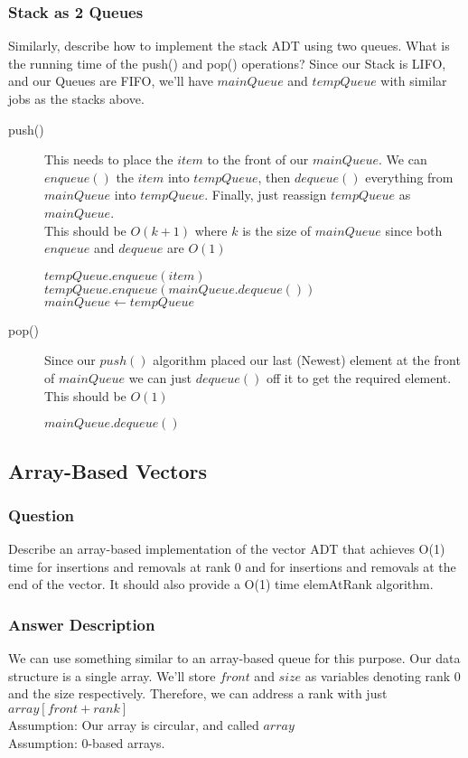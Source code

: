 \documentclass[12pt]{article}
\begin{document}
\subsubsection{Stack as 2 Queues}
Similarly, describe how to implement the stack ADT using two queues. What is the running time of the push() and pop() operations?
\linebreak
\linebreak
Since our Stack is LIFO, and our Queues are FIFO, we'll have $ mainQueue $ and $ tempQueue $ with similar jobs as the stacks above.
\begin{description}
	\item[push()] This needs to place the $ item $ to the front of our $ mainQueue $. We can $ enqueue() $ the $ item $ into $ tempQueue $, then $ dequeue() $ everything from $ mainQueue $ into $ tempQueue $. Finally, just reassign $tempQueue $ as $ mainQueue $. \\
		This should be $ O(k+1) $ where $ k $ is the size of $ mainQueue $ since both $ enqueue $ and $ dequeue $ are $ O(1) $
		\begin{algorithmic}
			\State $ tempQueue.enqueue(item) $
				\State $ tempQueue.enqueue(mainQueue.dequeue()) $
			\EndWhile
			\State $ mainQueue \gets tempQueue $
		\end{algorithmic}
	\item[pop()] Since our $ push() $ algorithm placed our last (Newest) element at the front of $ mainQueue $ we can just $ dequeue() $ off it to get the required element.
		This should be $ O(1) $
		\begin{algorithmic}
			\State $ mainQueue.dequeue() $
		\end{algorithmic}
\end{description}

\subsection{Array-Based Vectors}
\subsubsection{Question}
Describe an array-based implementation of the vector ADT that achieves O(1) time for insertions and removals at rank 0 and for insertions and removals at the end of the vector. It should also provide a O(1) time elemAtRank algorithm.
\subsubsection{Answer Description}
We can use something similar to an array-based queue for this purpose.
Our data structure is a single array.
We'll store $ front $ and $ size $ as variables denoting rank 0 and the size respectively. Therefore, we can address a rank with just $ array[front+rank] $\\
Assumption: Our array is circular, and called $ array $ \\
Assumption: 0-based arrays.
\end{document}
